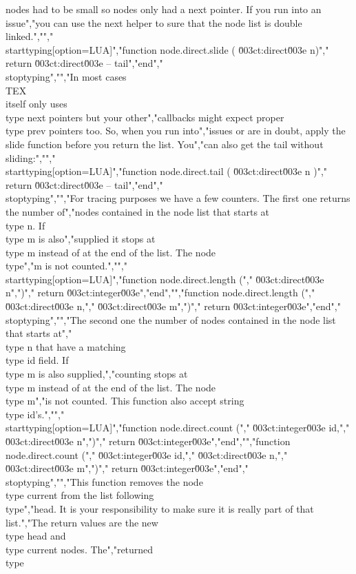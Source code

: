 nodes had to be small so nodes only had a next pointer. If you run into an issue","you can use the next helper to sure that the node list is double linked.","","\\starttyping[option=LUA]","function node.direct.slide ( \u003ct:direct\u003e n)","    return \u003ct:direct\u003e -- tail","end","\\stoptyping","","In most cases \\TEX\\ itself only uses \\type {next} pointers but your other","callbacks might expect proper \\type {prev} pointers too. So, when you run into","issues or are in doubt, apply the slide function before you return the list. You","can also get the tail without sliding:","","\\starttyping[option=LUA]","function node.direct.tail ( \u003ct:direct\u003e n )","    return \u003ct:direct\u003e -- tail","end","\\stoptyping","","For tracing purposes we have a few counters. The first one returns the number of","nodes contained in the node list that starts at \\type {n}. If \\type {m} is also","supplied it stops at \\type {m} instead of at the end of the list. The node \\type","{m} is not counted.","","\\starttyping[option=LUA]","function node.direct.length (","    \u003ct:direct\u003e n",")","    return \u003ct:integer\u003e","end","","function node.direct.length (","    \u003ct:direct\u003e n,","    \u003ct:direct\u003e m",")","    return \u003ct:integer\u003e","end","\\stoptyping","","The second one the number of nodes contained in the node list that starts at","\\type {n} that have a matching \\type {id} field. If \\type {m} is also supplied,","counting stops at \\type {m} instead of at the end of the list. The node \\type {m}","is not counted. This function also accept string \\type {id}'s.","","\\starttyping[option=LUA]","function node.direct.count (","    \u003ct:integer\u003e id,","    \u003ct:direct\u003e  n",")","    return \u003ct:integer\u003e","end","","function node.direct.count (","    \u003ct:integer\u003e id,","    \u003ct:direct\u003e  n,","    \u003ct:direct\u003e  m",")","    return \u003ct:integer\u003e","end","\\stoptyping","","This function removes the node \\type {current} from the list following \\type","{head}. It is your responsibility to make sure it is really part of that list.","The return values are the new \\type {head} and \\type {current} nodes. The","returned \\type 